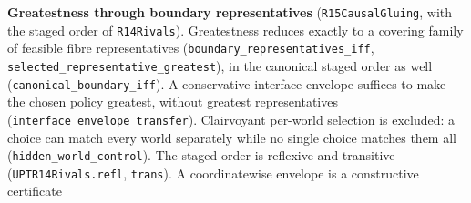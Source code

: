 \documentclass[
]{article}
\begin{document}
\textbf{Greatestness through boundary representatives}
(\texttt{R15CausalGluing}, with the staged order of \texttt{R14Rivals}).
Greatestness reduces exactly to a covering family of feasible fibre
representatives
(\texttt{b\allowbreak{}o\allowbreak{}u\allowbreak{}n\allowbreak{}d\allowbreak{}a\allowbreak{}r\allowbreak{}y\allowbreak{}\_\allowbreak{}r\allowbreak{}e\allowbreak{}p\allowbreak{}r\allowbreak{}e\allowbreak{}s\allowbreak{}e\allowbreak{}n\allowbreak{}t\allowbreak{}a\allowbreak{}t\allowbreak{}i\allowbreak{}v\allowbreak{}e\allowbreak{}s\allowbreak{}\_\allowbreak{}i\allowbreak{}f\allowbreak{}f},
\texttt{s\allowbreak{}e\allowbreak{}l\allowbreak{}e\allowbreak{}c\allowbreak{}t\allowbreak{}e\allowbreak{}d\allowbreak{}\_\allowbreak{}r\allowbreak{}e\allowbreak{}p\allowbreak{}r\allowbreak{}e\allowbreak{}s\allowbreak{}e\allowbreak{}n\allowbreak{}t\allowbreak{}a\allowbreak{}t\allowbreak{}i\allowbreak{}v\allowbreak{}e\allowbreak{}\_\allowbreak{}g\allowbreak{}r\allowbreak{}e\allowbreak{}a\allowbreak{}t\allowbreak{}e\allowbreak{}s\allowbreak{}t}),
in the canonical staged order as well
(\texttt{c\allowbreak{}a\allowbreak{}n\allowbreak{}o\allowbreak{}n\allowbreak{}i\allowbreak{}c\allowbreak{}a\allowbreak{}l\allowbreak{}\_\allowbreak{}b\allowbreak{}o\allowbreak{}u\allowbreak{}n\allowbreak{}d\allowbreak{}a\allowbreak{}r\allowbreak{}y\allowbreak{}\_\allowbreak{}i\allowbreak{}f\allowbreak{}f}).
A conservative interface envelope suffices to make the chosen policy
greatest, without greatest representatives
(\texttt{i\allowbreak{}n\allowbreak{}t\allowbreak{}e\allowbreak{}r\allowbreak{}f\allowbreak{}a\allowbreak{}c\allowbreak{}e\allowbreak{}\_\allowbreak{}e\allowbreak{}n\allowbreak{}v\allowbreak{}e\allowbreak{}l\allowbreak{}o\allowbreak{}p\allowbreak{}e\allowbreak{}\_\allowbreak{}t\allowbreak{}r\allowbreak{}a\allowbreak{}n\allowbreak{}s\allowbreak{}f\allowbreak{}e\allowbreak{}r}).
Clairvoyant per-world selection is excluded: a choice can match every
world separately while no single choice matches them all
(\texttt{h\allowbreak{}i\allowbreak{}d\allowbreak{}d\allowbreak{}e\allowbreak{}n\allowbreak{}\_\allowbreak{}w\allowbreak{}o\allowbreak{}r\allowbreak{}l\allowbreak{}d\allowbreak{}\_\allowbreak{}c\allowbreak{}o\allowbreak{}n\allowbreak{}t\allowbreak{}r\allowbreak{}o\allowbreak{}l}).
The staged order is reflexive and transitive
(\texttt{U\allowbreak{}P\allowbreak{}T\allowbreak{}R\allowbreak{}1\allowbreak{}4\allowbreak{}R\allowbreak{}i\allowbreak{}v\allowbreak{}a\allowbreak{}l\allowbreak{}s\allowbreak{}.\allowbreak{}r\allowbreak{}e\allowbreak{}f\allowbreak{}l},
\texttt{trans}). A coordinatewise envelope is a constructive certificate
\end{document}
